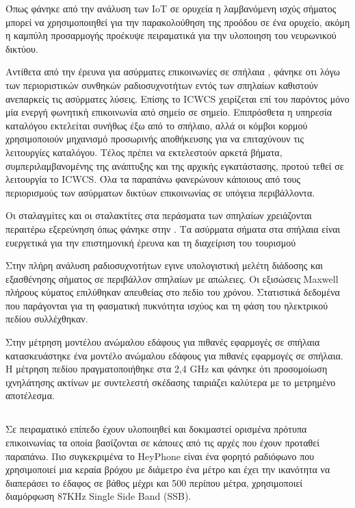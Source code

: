        Όπως φάνηκε από την ανάλυση των IoT σε ορυχεία \cite{ming_study_2019} η λαμβανόμενη ισχύς
        σήματος μπορεί να χρησιμοποιηθεί για την παρακολούθηση της προόδου σε ένα ορυχείο, ακόμη 
        η καμπύλη προσαρμογής προέκυψε πειραματικά για την υλοποιηση του νευρωνικού δικτύου.

        Αντίθετα από την έρευνα για ασύρματες επικοινωνίες σε σπήλαια \cite{yavuz_-cave_2009},
        φάνηκε οτι λόγω των περιοριστικών συνθηκών ραδιοσυχνοτήτων εντός των σπηλαίων καθιστούν
        ανεπαρκείς τις ασύρματες λύσεις. Επίσης το ICWCS χειρίζεται επί του παρόντος μόνο μία
        ενεργή φωνητική επικοινωνία από σημείο σε σημείο. Επιπρόσθετα η υπηρεσία καταλόγου
        εκτελείται συνήθως έξω από το σπήλαιο, αλλά οι κόμβοι κορμού χρησιμοποιούν μηχανισμό
        προσωρινής αποθήκευσης για να επιταχύνουν τις λειτουργίες καταλόγου. Τέλος πρέπει να
        εκτελεστούν αρκετά βήματα, συμπεριλαμβανομένης της ανάπτυξης και της αρχικής εγκατάστασης,
        προτού τεθεί σε λειτουργία το ICWCS. Όλα τα παραπάνω φανερώνουν κάποιους από τους
        περιορισμούς των ασύρματων δικτύων επικοινωνίας σε υπόγεια περιβάλλοντα.

        Οι σταλαγμίτες και οι σταλακτίτες στα περάσματα των σπηλαίων χρειάζονται περαιτέρω
        εξερεύνηση όπως φάνηκε στην \cite{soo_propagation_2018}.
        Τα ασύρματα σήματα στα σπήλαια είναι ευεργετικά για την επιστημονική έρευνα και τη 
        διαχείριση του τουρισμού

        Στην πλήρη ανάλυση ραδιοσυχνοτήτων \cite{pingenot_full_2005} εγινε υπολογιστική μελέτη
        διάδοσης και εξασθένησης σήματος σε περιβάλλον σπηλαίων με απώλειες. Οι εξισώσεις Maxwell
        πλήρους κύματος επιλύθηκαν απευθείας στο πεδίο του χρόνου. Στατιστικά δεδομένα που παράγονται
        για τη φασματική πυκνότητα ισχύος και τη φάση του ηλεκτρικού πεδίου συλλέχθηκαν.

        Στην μέτρηση μοντέλου ανώμαλου εδάφους για πιθανές εφαρμογές σε σπήλαια \cite{soo_measurement_2019}
        κατασκευάστηκε ένα μοντέλο ανώμαλου εδάφους για πιθανές εφαρμογές σε σπήλαια. Η μέτρηση πεδίου
        πραγματοποιήθηκε στα 2,4 GHz και φάνηκε ότι προσομοίωση ιχνηλάτησης ακτίνων με συντελεστή 
        σκέδασης ταιριάζει καλύτερα με το μετρημένο αποτέλεσμα.

    \subsection{}
        Σε πειραματικό επίπεδο έχουν υλοποιηθεί και δοκιμαστεί ορισμένα πρότυπα επικοινωνίας
        τα οποία βασίζονται σε κάποιες από τις αρχές που έχουν προταθεί παραπάνω. Πιο
        συγκεκριμένα το HeyPhone είναι ένα φορητό ραδιόφωνο που χρησιμοποιεί μια κεραία βρόχου
        με διάμετρο ένα μέτρο και έχει την ικανότητα να διαπεράσει το έδαφος σε βάθος μέχρι
        και 500 περίπου μέτρα, χρησιμοποιεί διαμόρφωση 87KHz Single Side Band (SSB).

